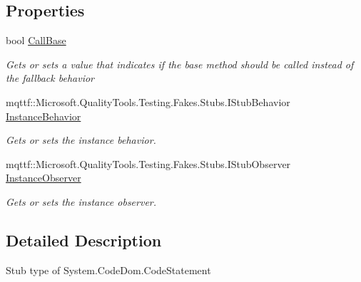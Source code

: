 \subsection*{Properties}
\begin{DoxyCompactItemize}
\item 
bool \hyperlink{class_system_1_1_code_dom_1_1_fakes_1_1_stub_code_statement_ae4cf12fc13ce45b0cbcf5c82407dde57}{Call\-Base}
\begin{DoxyCompactList}\small\item\em Gets or sets a value that indicates if the base method should be called instead of the fallback behavior\end{DoxyCompactList}\item 
mqttf\-::\-Microsoft.\-Quality\-Tools.\-Testing.\-Fakes.\-Stubs.\-I\-Stub\-Behavior \hyperlink{class_system_1_1_code_dom_1_1_fakes_1_1_stub_code_statement_a92f148ea4ee2f268db127b5532963ea0}{Instance\-Behavior}
\begin{DoxyCompactList}\small\item\em Gets or sets the instance behavior.\end{DoxyCompactList}\item 
mqttf\-::\-Microsoft.\-Quality\-Tools.\-Testing.\-Fakes.\-Stubs.\-I\-Stub\-Observer \hyperlink{class_system_1_1_code_dom_1_1_fakes_1_1_stub_code_statement_a597c6cc3f71db81ca09e14607f4bca1d}{Instance\-Observer}
\begin{DoxyCompactList}\small\item\em Gets or sets the instance observer.\end{DoxyCompactList}\end{DoxyCompactItemize}


\subsection{Detailed Description}
Stub type of System.\-Code\-Dom.\-Code\-Statement




